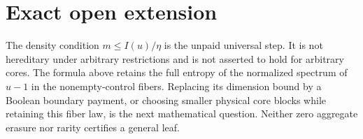 \documentclass{article}
\begin{document}
\section*{Exact open extension}
The density condition $m\le I(u)/\eta$ is the unpaid universal step. It is not hereditary under arbitrary restrictions and is not asserted to hold for arbitrary cores. The formula above retains the full entropy of the normalized spectrum of $u-1$ in the nonempty-control fibers. Replacing its dimension bound by a Boolean boundary payment, or choosing smaller physical core blocks while retaining this fiber law, is the next mathematical question. Neither zero aggregate erasure nor rarity certifies a general leaf.
\end{document}
